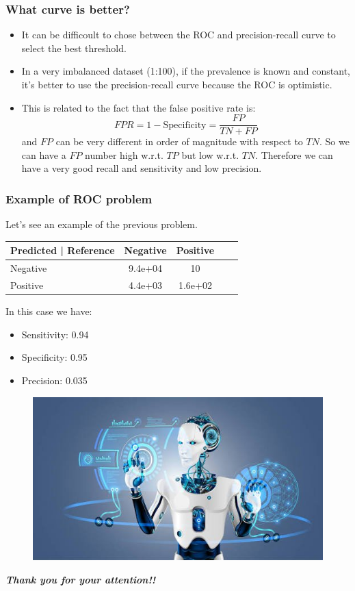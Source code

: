 \documentclass[9pt]{beamer}
\begin{document}
\begin{frame}
\frametitle{What curve is better?}
\begin{itemize}
\item It can be difficoult to chose between the ROC and precision-recall curve to select the best threshold.
\item In a very imbalanced dataset (1:100), if the prevalence is known and constant, it's better to use the precision-recall curve because the ROC is optimistic.
\item This is related to the fact that the false positive rate is:
$$
FPR = 1 - \mbox{Specificity}= \dfrac{FP}{TN + FP}
$$
and $FP$ can be very different in order of magnitude with respect to $TN$. So we can have a $FP$ number high w.r.t. $TP$ but low w.r.t. $TN$. Therefore we can have a very good recall and sensitivity and low precision.
\end{itemize}
\end{frame}

\begin{frame}
\frametitle{Example of ROC problem}
Let's see an example of the previous problem.\\
\begin{table}
\begin{tabular}{l | c | c | c | c }
Predicted | Reference & Negative & Positive \\
\hline \hline
Negative & 9.4e+04 & 10 \\ 
Positive & 4.4e+03 & 1.6e+02 \\
\end{tabular}
\end{table}
In this case we have:
\begin{itemize}
\item Sensitivity: 0.94
\item Specificity: 0.95
\item Precision: 0.035
\end{itemize}
\end{frame}

\begin{frame}{}
\begin{figure}[ht]
\includegraphics[scale=0.25]{images/thankyou.jpeg}
\end{figure}
  \centering \Huge
  \emph{\textbf{Thank you for your attention!!}}
\end{frame}
\end{document}
